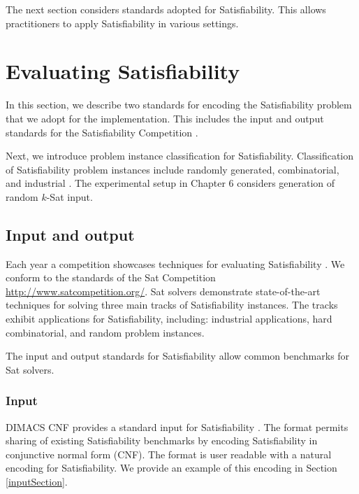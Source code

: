 The next section considers standards adopted for {\sc Satisfiability}.  This allows practitioners to apply {\sc Satisfiability} in various settings.
	
\section{Evaluating {\sc Satisfiability}}

	
	In this section, we describe two standards for encoding the {\sc Satisfiability} problem that we adopt for the implementation.  This includes the input and output standards for the {\sc Satisfiability} Competition \cite{dimacsFormat, satcompetition}.  
	
	Next, we introduce problem instance classification for {\sc Satisfiability}.  Classification of {\sc Satisfiability} problem instances include randomly generated, combinatorial, and industrial \cite{satcompetition}.  The experimental setup in Chapter 6 considers generation of random $k$-{\sc Sat} input.

	\subsection{Input and output}
	
	
 Each year a competition showcases techniques for evaluating {\sc Satisfiability} \cite{satcompetition}.  We conform to the standards of the {\sc Sat} Competition \url{http://www.satcompetition.org/}.  {\sc Sat} solvers demonstrate state-of-the-art techniques for solving three main tracks of {\sc Satisfiability} instances.  The tracks exhibit applications for {\sc Satisfiability}, including: industrial applications, hard combinatorial, and random problem instances.
 
 The input and output standards for {\sc Satisfiability} allow common benchmarks for {\sc Sat} solvers.
	
		\subsubsection{Input}
		
DIMACS CNF provides a standard input for {\sc Satisfiability} \cite{dimacsFormat}.  The format permits sharing of existing {\sc Satisfiability} benchmarks by encoding {\sc Satisfiability} in conjunctive normal form (CNF).  The format is user readable with a natural encoding for {\sc Satisfiability}.  We provide an example of this encoding in Section \ref{inputSection}.
		
